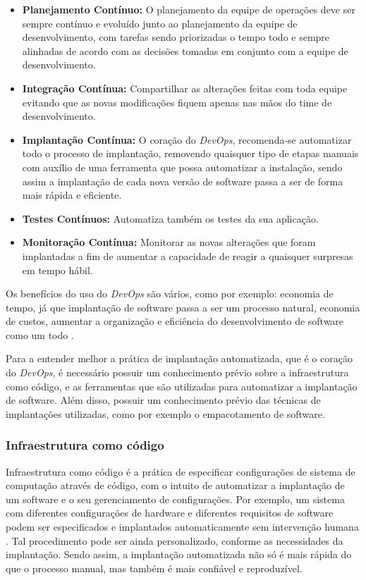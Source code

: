  \begin{itemize}
   \item \textbf{Planejamento Contínuo:} O planejamento da equipe de operações 
deve ser sempre contínuo
   e evoluído junto ao planejamento da equipe de desenvolvimento, com tarefas
   sendo priorizadas o tempo todo e sempre alinhadas de acordo com as decisões tomadas
   em conjunto com a equipe de desenvolvimento.
   \item \textbf{Integração Contínua:} Compartilhar as alterações feitas com toda equipe
   evitando que as novas modificações fiquem apenas nas mãos do time de desenvolvimento.
   \item \textbf{Implantação Contínua:} O coração do \textit{DevOps}, recomenda-se automatizar
   todo o processo de implantação, removendo quaisquer tipo de etapas manuais com auxílio
   de uma ferramenta que possa automatizar a instalação, sendo assim a implantação
   de cada nova versão de software passa a ser de forma mais rápida e eficiente.
   \item \textbf{Testes Contínuos:} Automatiza também os testes da sua aplicação.
   \item \textbf{Monitoração Contínua:} Monitorar as novas alterações
   que foram implantadas a fim de aumentar a capacidade de reagir a quaisquer surpresas
   em tempo hábil.
 \end{itemize}

 Os benefícios do uso do \textit{DevOps} são vários, como por exemplo: economia de tempo,
 já que implantação de software passa a ser um processo natural, economia de custos, aumentar
 a organização e eficiência do desenvolvimento de software como um todo \cite{7173368}.

Para a entender melhor a prática de implantação automatizada, que é o coração
do \textit{DevOps}, é necessário possuir um conhecimento prévio sobre  a infraestrutura
como código, e as ferramentas que são utilizadas para
automatizar a implantação de software. Além disso,
possuir um conhecimento prévio das técnicas
de implantações utilizadas, como por exemplo o empacotamento de software.

\subsubsection{Infraestrutura como código}

Infraestrutura como código é a prática de especificar configurações de
sistema de computação através de código, com o intuito de automatizar a implantação
de um software e o seu gerenciamento de configurações. Por exemplo, um sistema
com diferentes configurações de hardware e diferentes
requisitos de software podem ser especificados e implantados automaticamente
sem intervenção humana \cite{configurationcodesmell}. Tal procedimento pode ser
ainda personalizado, conforme as necessidades da implantação. Sendo assim, a implantação
automatizada não só é mais rápida do que o processo manual, mas também é mais
confiável e reproduzível.

